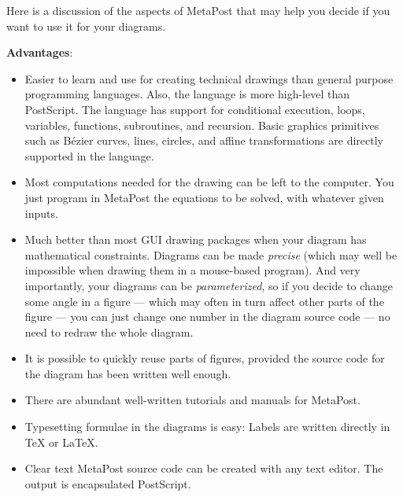 Here is a discussion of the aspects of MetaPost that may help you decide if you want to use it for your diagrams.

\textbf{Advantages}:
\begin{itemize}
\item
Easier to learn and use for creating technical drawings than general purpose programming languages. Also, the language is more high-level than PostScript. The language has support for conditional execution, loops, variables, functions, subroutines, and recursion. Basic graphics primitives such as B\'ezier curves, lines, circles, and affine transformations are directly supported in the language.
\item
Most computations needed for the drawing can be left to the computer. You just program in MetaPost the equations to be solved, with whatever given inputs.
\item
Much better than most GUI drawing packages when your diagram has mathematical
constraints. Diagrams can be made \emph{precise} (which may well be impossible when drawing them in a mouse-based program). And very importantly, your diagrams can be \emph{parameterized},
so if you decide to change some angle in a figure --- which may often in turn affect other parts of the figure --- you can just change one number in the diagram source code --- no need to redraw the whole diagram.
\item
It is possible to quickly reuse parts of figures, provided the source code for the diagram has been written well enough.
\item
There are abundant well-written tutorials and manuals for MetaPost.
\item
Typesetting formulae in the diagrams is easy: Labels are written directly in TeX
or LaTeX.
\item
Clear text MetaPost source code can be created with any text editor.
The output is encapsulated PostScript.
\end{itemize}

